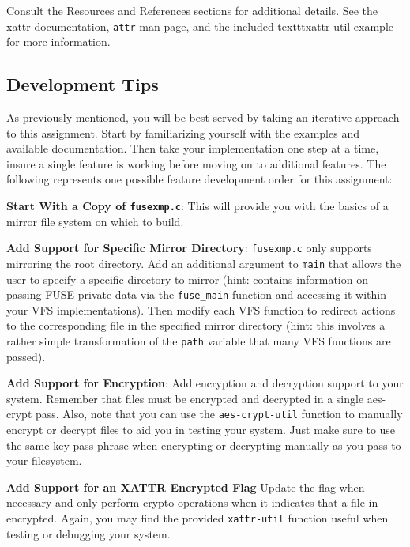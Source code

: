 \documentclass[12pt]{article}
\newenvironment{packed_enum}{
\begin{enumerate}
  \setlength{\itemsep}{1pt}
  \setlength{\parskip}{0pt}
  \setlength{\parsep}{0pt}
}{\end{enumerate}}
\begin{document}
Consult the Resources and References sections for additional
details. See the xattr documentation, \texttt{attr} man page, and the included
texttt{xattr-util} example for more information.

\subsection{Development Tips}

As previously mentioned, you will be best served by taking an iterative
approach to this assignment. Start by familiarizing yourself with the
examples and available documentation. Then take your implementation one
step at a time, insure a single feature is working before moving on to
additional features. The following represents one possible feature development
order for this assignment:

\begin{packed_enum}
\item {\bf Start With a Copy of \texttt{fusexmp.c}}: This will provide
  you with the basics of a mirror file system on which to build.
\item {\bf Add Support for Specific Mirror Directory}:
  \texttt{fusexmp.c} only supports mirroring the root directory. Add an
  additional argument to \texttt{main} that allows the user to specify a specific
  directory to mirror (hint: \cite{pfeiffer-fuse} contains information
  on passing FUSE private data via the \texttt{fuse\_main} function 
  and accessing it within your VFS implementations).
  Then modify each VFS function to redirect
  actions to the corresponding file in the specified mirror directory
  (hint: this involves a
  rather simple transformation of the \texttt{path} variable that many
  VFS functions are passed).
\item {\bf Add Support for Encryption}: Add encryption and decryption
  support to your system. Remember that files must be encrypted and
  decrypted in a single aes-crypt pass. Also, note that you can
  use the \texttt{aes-crypt-util} function to manually encrypt or decrypt files
  to aid you in testing your system. Just make sure to use the same
  key pass phrase when encrypting or decrypting manually as you pass to
  your filesystem.
\item {\bf Add Support for an XATTR Encrypted Flag} Update the flag
  when necessary and only perform crypto operations when it indicates
  that a file in encrypted. Again, you may find the provided
  \texttt{xattr-util} function useful when testing or debugging your
  system.
\end{packed_enum}
\end{document}
